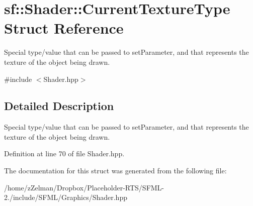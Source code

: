 \hypertarget{structsf_1_1Shader_1_1CurrentTextureType}{\section{sf\-:\-:Shader\-:\-:Current\-Texture\-Type Struct Reference}
\label{structsf_1_1Shader_1_1CurrentTextureType}
}


Special type/value that can be passed to set\-Parameter, and that represents the texture of the object being drawn.  




{\ttfamily \#include $<$Shader.\-hpp$>$}



\subsection{Detailed Description}
Special type/value that can be passed to set\-Parameter, and that represents the texture of the object being drawn. 

Definition at line 70 of file Shader.\-hpp.



The documentation for this struct was generated from the following file\-:\begin{DoxyCompactItemize}
\item 
/home/z\-Zelman/\-Dropbox/\-Placeholder-\/\-R\-T\-S/\-S\-F\-M\-L-\/2./include/\-S\-F\-M\-L/\-Graphics/Shader.\-hpp\end{DoxyCompactItemize}
